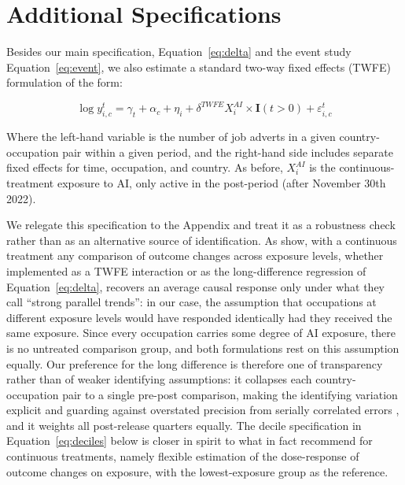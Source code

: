 \documentclass[11pt]{article}
\begin{document}
\section{Additional Specifications}
\label{sec:twfe}

Besides our main specification, Equation~\ref{eq:delta} and the event study Equation~\ref{eq:event}, we also estimate a standard two-way fixed effects (TWFE) formulation of the form:

\begin{equation}
    \log{y^t_{i,c}}=\gamma_t + \alpha_c + \eta_i + \delta^{TWFE} X^{AI}_{i} \times \mathbf{I}(t>0) + \varepsilon^t_{i,c}
    \label{eq:twfe}
\end{equation}

Where the left-hand variable is the number of job adverts in a given country-occupation pair within a given period, and the right-hand side includes separate fixed effects for time, occupation, and country. As before, $X^{AI}_i$ is the continuous-treatment exposure to AI, only active in the post-period (after November 30th 2022).

We relegate this specification to the Appendix and treat it as a robustness check rather than as an alternative source of identification. As \citet{Callaway2024} show, with a continuous treatment any comparison of outcome changes across exposure levels, whether implemented as a TWFE interaction or as the long-difference regression of Equation~\ref{eq:delta}, recovers an average causal response only under what they call ``strong parallel trends'': in our case, the assumption that occupations at different exposure levels would have responded identically had they received the same exposure. Since every occupation carries some degree of AI exposure, there is no untreated comparison group, and both formulations rest on this assumption equally. Our preference for the long difference is therefore one of transparency rather than of weaker identifying assumptions: it collapses each country-occupation pair to a single pre-post comparison, making the identifying variation explicit and guarding against overstated precision from serially correlated errors \citep{bertrand2004much}, and it weights all post-release quarters equally. The decile specification in Equation~\ref{eq:deciles} below is closer in spirit to what \citet{Callaway2024} in fact recommend for continuous treatments, namely flexible estimation of the dose-response of outcome changes on exposure, with the lowest-exposure group as the reference.
\end{document}
